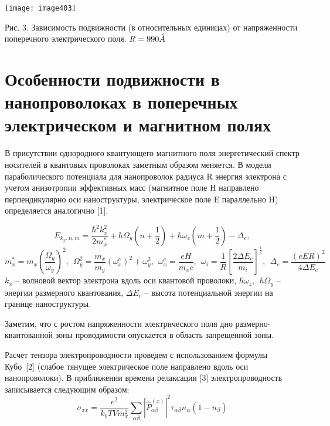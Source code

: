\texttt{[image: image403]}

\noindent Рис. 3. Зависимость подвижности (в относительных единицах) от напряженности поперечного электрического поля. $R=990 \AA$



\section{Особенности подвижности в нанопроволоках в поперечных электрическом и магнитном полях} \label{sect4_3}

В присутствии однородного квантующего магнитного поля энергетический спектр носителей в квантовых проволоках заметным образом меняется. В модели параболического потенциала для нанопроволок радиуса R энергия электрона с учетом анизотропии эффективных масс (магнитное поле H  направлено перпендикулярно оси наноструктуры, электрическое поле E параллельно H) определяется аналогично [1].

\begin{equation} \label{eq:43_10}
	E_{k_x,n,m}=\frac{{\hbar }^2k^2_x}{2m^*_x}+\hbar {\Omega }_y\left(n+\frac{1}{2}\right)+\hbar {\omega }_z\left(m+\frac{1}{2}\right)-{\Delta }_c,   
\end{equation}
\[
m^*_x=m_x{\left(\frac{{\Omega }_y}{{\omega }_y}\right)}^2,\ \ {\Omega }^2_y=\frac{m_x}{m_y}{\left({\omega }^c_x\right)}^2+{\omega }^2_y,\ \ {\omega }^c_x=\frac{eH}{m_xc},\ \ {\omega }_i=\frac{1}{R}{\left[\frac{2\Delta E_c}{m_i}\right]}^{\frac{1}{2}},\ \ {\Delta }_c=\frac{{\left(eER\right)}^2}{4\Delta E_c}
\]
$k_x$ -- волновой вектор электрона вдоль оси квантовой проволоки, $\hbar {\omega }_z,\ \ \hbar {\Omega }_y$ -- энергии размерного квантования, $\Delta E_c$ -- высота потенциальной энергии на границе наноструктуры.

Заметим, что с ростом напряженности электрического поля дно размерно-квантованной зоны проводимости опускается в область запрещенной зоны.

Расчет тензора электропроводности проведем с использованием формулы Кубо~[2] (слабое тянущее электрическое поле направлено вдоль оси нанопроволоки). В приближении времени релаксации [3] электропроводность записывается следующим образом:
\begin{equation} \label{eq:43_20}
{\sigma }_{xx}=\frac{e^2}{k_0TVm^2_x}\sum_{\alpha \beta }{{\left|{\hat{P}}^{\left(x\right)}_{\alpha \beta }\right|}^2{\tau }_{\alpha \beta }n_{\alpha }\left(1-n_{\beta }\right)}
\end{equation}

